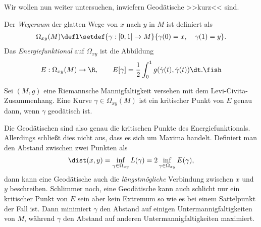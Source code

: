 \documentclass[%
	paper=a5,%
	fleqn,%
	DIV=18,%
	BCOR=0mm,
	fontsize=11pt,
	titlepage=false,%
	bibliography=totoc,
	DIV=18,%
	twoside=true,
	pdftitle=Riemannsche Geometrie,
	pdfauthor=Uwe Semmelmann,
	numbers=noendperiod]%
	{scrbook}
\begin{document}
Wir wollen nun weiter untersuchen, inwiefern Geodätische >>kurz<< sind.

\begin{defn}
Der \emph{Wegeraum} der glatten Wege von $x$ nach $y$ in $M$ ist definiert als
\begin{align*}
\Omega_{xy}(M) \defl \setdef{\gamma:[0,1]\to M}{\gamma(0)=x,\quad \gamma(1)=y}.
\end{align*} 
Das \emph{Energiefunktional} auf $\Omega_{xy}$ ist die Abbildung
\begin{align*}
E: \Omega_{xy}(M) \to \R,\qquad
E[\gamma] = \frac{1}{2} \int_0^1 g(\dot{\gamma}(t),\dot{\gamma}(t))\dt.\fish
\end{align*}
\end{defn}

\begin{prop}
Sei $(M,g)$ eine Riemannsche Mannigfaltigkeit versehen mit dem Levi-Civita-Zusammenhang.
Eine Kurve $\gamma\in \Omega_{xy}(M)$ ist ein kritischer Punkt von $E$ genau
dann, wenn $\gamma$ geodätisch ist.\fish
\end{prop}


Die Geodätischen sind also genau die kritischen Punkte des
Energiefunktionals. Allerdings schließt dies nicht aus, dass es sich um Maxima
handelt. Definiert man den Abstand zwischen zwei Punkten als
\begin{align*}
\dist(x,y) = \inf_{\gamma\in \Omega_{xy}} L(\gamma) = 2 \inf_{\gamma\in
\Omega_{xy}} E(\gamma),
\end{align*}
dann kann eine Geodätische auch die \textit{längstmögliche} Verbindung zwischen
$x$ und $y$ beschreiben. Schlimmer noch, eine Geodätische kann auch schlicht nur
ein kritischer Punkt von $E$ sein aber kein Extremum so wie es bei einem
Sattelpunkt der Fall ist. Dann minimiert $\gamma$ den Abstand auf einigen
Untermannigfaltigkeiten von $M$, während $\gamma$ den Abstand auf anderen
Untermannigfaltigkeiten maximiert.
\end{document}
